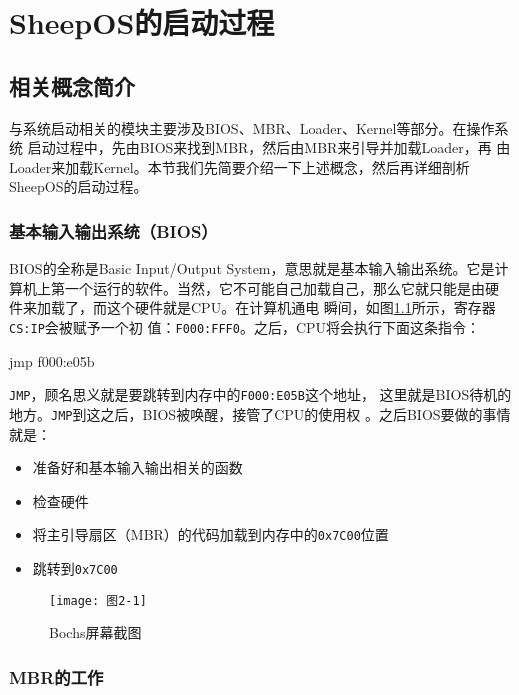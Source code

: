\chapter{SheepOS的启动过程}
\label{cha:OSboot}

\section{相关概念简介}

与系统启动相关的模块主要涉及BIOS、MBR、Loader、Kernel等部分。在操作系统
启动过程中，先由BIOS来找到MBR，然后由MBR来引导并加载Loader，再
由Loader来加载Kernel。本节我们先简要介绍一下上述概念，然后再详细剖析
SheepOS的启动过程。

\subsection{基本输入输出系统（BIOS）}
\label{sec:BIOS}

BIOS的全称是Basic Input/Output System，意思就是基本输入输出系统。它是计
算机上第一个运行的软件。当然，它不可能自己加载自己，那么它就只能是由硬
件来加载了，而这个硬件就是CPU\cite{zg2016}。在计算机通电
瞬间，如图\ref{fig:img2-1}所示，寄存器\texttt{CS:IP}会被赋予一个初
值：\texttt{F000:FFF0}。之后，CPU将会执行下面这条指令：
\begin{codeblock}
\begin{nasmcode}
jmp f000:e05b
\end{nasmcode}
\end{codeblock}
\texttt{JMP}，顾名思义就是要跳转到内存中的\texttt{F000:E05B}这个地址，
这里就是BIOS待机的地方。\texttt{JMP}到这之后，BIOS被唤醒，接管了CPU的使用权
。之后BIOS要做的事情就是：
\begin{itemize}
\item 准备好和基本输入输出相关的函数
\item 检查硬件
\item 将主引导扇区（MBR）的代码加载到内存中的\texttt{0x7C00}位置
\item 跳转到\texttt{0x7C00}
\end{itemize}

\begin{figure}[H]
  \centering
  \texttt{[image: 图2-1]}  
  \caption{Bochs屏幕截图}
  \label{fig:img2-1}
\end{figure}

\subsection{MBR的工作}
\label{sec:MBR}

